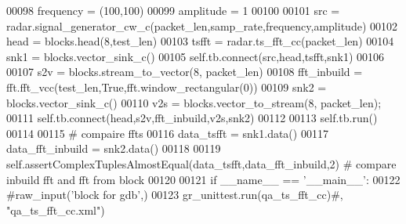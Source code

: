 \begin{DoxyCode}
00098         frequency = (100,100)
00099         amplitude = 1
00100 
00101         src = radar.signal\_generator\_cw\_c(packet\_len,samp\_rate,frequency,amplitude)
00102         head = blocks.head(8,test\_len)
00103         tsfft = radar.ts\_fft\_cc(packet\_len)
00104         snk1 = blocks.vector\_sink\_c()
00105         self.tb.connect(src,head,tsfft,snk1)
00106 
00107         s2v = blocks.stream\_to\_vector(8, packet\_len)
00108         fft\_inbuild = fft.fft\_vcc(test\_len,\textcolor{keyword}{True},fft.window\_rectangular(0))
00109         snk2 = blocks.vector\_sink\_c()
00110         v2s = blocks.vector\_to\_stream(8, packet\_len);
00111         self.tb.connect(head,s2v,fft\_inbuild,v2s,snk2)
00112 
00113         self.tb.run()
00114 
00115         \textcolor{comment}{# compaire ffts}
00116         data\_tsfft = snk1.data()
00117         data\_fft\_inbuild = snk2.data()
00118 
00119         self.assertComplexTuplesAlmostEqual(data\_tsfft,data\_fft\_inbuild,2) \textcolor{comment}{# compare inbuild fft and fft
       from block}
00120 
00121 \textcolor{keywordflow}{if} \_\_name\_\_ == \textcolor{stringliteral}{'\_\_main\_\_'}:
00122     \textcolor{comment}{#raw\_input('block for gdb',)}
00123     gr\_unittest.run(qa\_ts\_fft\_cc)\textcolor{comment}{#, "qa\_ts\_fft\_cc.xml")}
\end{DoxyCode}
